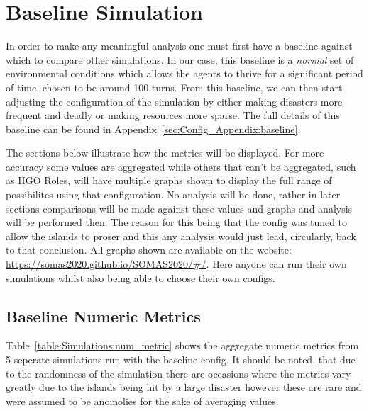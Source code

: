 \section{Baseline Simulation}
\label{sec:Simulations:baseline}

In order to make any meaningful analysis one must first have a baseline against which to compare other simulations. In our case, this baseline is a \emph{normal} set of environmental conditions which allows the agents to thrive for a significant period of time, chosen to be around 100 turns. From this baseline, we can then start adjusting the configuration of the simulation by either making disasters more frequent and deadly or making resources more sparse. The full details of this baseline can be found in Appendix~\ref{sec:Config_Appendix:baseline}.

The sections below illustrate how the metrics will be displayed. For more accuracy some values are aggregated while others that can't be aggregated, such as IIGO Roles, will have multiple graphs shown to display the full range of possibilites using that configuration. No analysis will be done, rather in later sections comparisons will be made against these values and graphs and analysis will be performed then. The reason for this being that the config was tuned to allow the islands to proser and this any analysis would just lead, circularly, back to that conclusion. All graphs shown are available on the website: \url{https://somas2020.github.io/SOMAS2020/\#/}. Here anyone can run their own simulations whilst also being able to choose their own configs.

\subsection{Baseline Numeric Metrics}
\label{subsec:Simulations:baseline:num_metrics}

Table~\ref{table:Simulations:num_metric} shows the aggregate numeric metrics from 5 seperate simulations run with the baseline config. It should be noted, that due to the randomness of the simulation there are occasions where the metrics vary greatly due to the islands being hit by a large disaster however these are rare and were assumed to be anomolies for the sake of averaging values.

